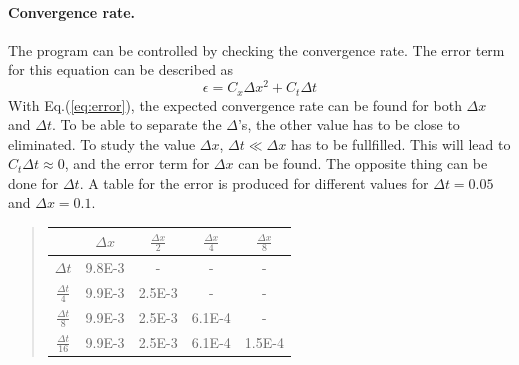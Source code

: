 \documentclass[%
twoside,                 %
final,                   %
10pt]{article}
\begin{document}
\paragraph{Convergence rate.}
The program can be controlled by checking the convergence rate. The error term  for this equation can be described as  
\begin{equation} \label{eq:error}
    \epsilon = C_x\Delta x^2 + C_t \Delta t
\end{equation}
With Eq.(\ref{eq:error}), the expected convergence rate can be found for both $\Delta x$ and $\Delta t$. To be able to separate the $\Delta$'s, the other value has to be close to eliminated. To study the value $\Delta x$,  $\Delta t \ll \Delta x$ has to be fullfilled. This will lead to $C_t\Delta t \approx 0$, and the error term for $\Delta x$ can be found. The opposite thing can  be done for $\Delta t$. A table for the error is produced for different values for $\Delta t = 0.05$ and $\Delta x=0.1$.

\label{table:error_numbers}

\begin{quote}
\begin{tabular}{ccccc}
\hline
\multicolumn{1}{c}{  } & \multicolumn{1}{c}{ $\Delta x$ } & \multicolumn{1}{c}{ $\frac{\Delta x}{2}$ } & \multicolumn{1}{c}{ $\frac{\Delta x}{4}$ } & \multicolumn{1}{c}{ $\frac{\Delta x}{8}$ } \\
\hline
$\Delta t     $       & 9.8E-3                & -                     & -                     & -                     \\
$\frac{\Delta t}{4} $ & 9.9E-3                & 2.5E-3                & -                     & -                     \\
$\frac{\Delta t}{8} $ & 9.9E-3                & 2.5E-3                & 6.1E-4                & -                     \\
$\frac{\Delta t}{16}$ & 9.9E-3                & 2.5E-3                & 6.1E-4                & 1.5E-4                \\
\hline
\end{tabular}
\end{quote}

\noindent
\end{document}
